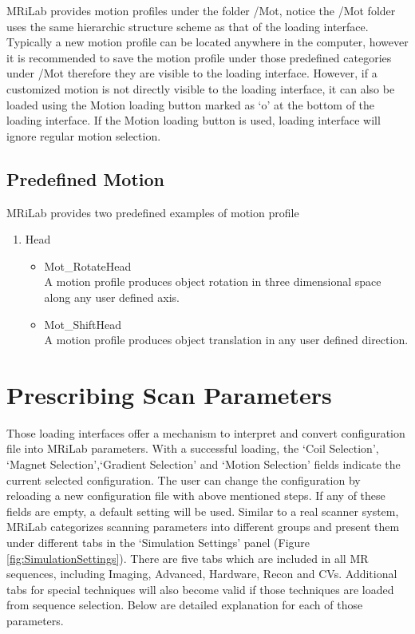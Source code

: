 \documentclass{book}%
\begin{document}
MRiLab provides motion profiles under the folder /Mot, notice the /Mot folder uses the same hierarchic structure scheme as that of the loading interface. Typically a new motion profile can be located anywhere in the computer, however it is recommended to save the motion profile under those predefined categories under /Mot therefore they are visible to the loading interface. However, if a customized motion is not directly visible to the loading interface, it can also be loaded using the Motion loading button marked as `o' at the bottom of the loading interface. If the Motion loading button is used, loading interface will ignore regular motion selection.

\subsection{Predefined Motion}

MRiLab provides two predefined examples of motion profile

\begin{enumerate}
		\item Head
		\begin{itemize}
			\item Mot\_RotateHead \\
			A motion profile produces object rotation in three dimensional space along any user defined axis.
			\item Mot\_ShiftHead \\
			A motion profile produces object translation in any user defined direction.
		\end{itemize}
\end{enumerate}

\section{Prescribing Scan Parameters}

Those loading interfaces offer a mechanism to interpret and convert configuration file into MRiLab parameters. With a successful loading, the `Coil Selection', `Magnet Selection',`Gradient Selection' and `Motion Selection' fields indicate the current selected configuration. The user can change the configuration by reloading a new configuration file with above mentioned steps. If any of these fields are empty, a default setting will be used. Similar to a real scanner system, MRiLab categorizes scanning parameters into different groups and present them under different tabs in the `Simulation Settings' panel (Figure \ref{fig:SimulationSettings}). There are five tabs which are included in all MR sequences, including Imaging, Advanced, Hardware, Recon and CVs. Additional tabs for special techniques will also become valid if those techniques are loaded from sequence selection. Below are detailed explanation for each of those parameters.
\end{document}
